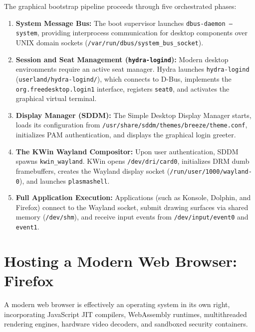 The graphical bootstrap pipeline proceeds through five orchestrated phases:
\begin{enumerate}
    \item \textbf{System Message Bus:} The boot supervisor launches \texttt{dbus-daemon --system}, providing interprocess communication for desktop components over UNIX domain sockets (\texttt{/var/run/dbus/system\_bus\_socket}).
    \item \textbf{Session and Seat Management (\texttt{hydra-logind}):} Modern desktop environments require an active seat manager. Hydra launches \texttt{hydra-logind} (\texttt{userland/hydra-logind/}), which connects to D-Bus, implements the \texttt{org.freedesktop.login1} interface, registers \texttt{seat0}, and activates the graphical virtual terminal.
    \item \textbf{Display Manager (SDDM):} The Simple Desktop Display Manager starts, loads its configuration from \texttt{/usr/share/sddm/themes/breeze/theme.conf}, initializes PAM authentication, and displays the graphical login greeter.
    \item \textbf{The KWin Wayland Compositor:} Upon user authentication, SDDM spawns \texttt{kwin\_wayland}. KWin opens \texttt{/dev/dri/card0}, initializes DRM dumb framebuffers, creates the Wayland display socket (\texttt{/run/user/1000/wayland-0}), and launches \texttt{plasmashell}.
    \item \textbf{Full Application Execution:} Applications (such as Konsole, Dolphin, and Firefox) connect to the Wayland socket, submit drawing surfaces via shared memory (\texttt{/dev/shm}), and receive input events from \texttt{/dev/input/event0} and \texttt{event1}.
\end{enumerate}

\section{Hosting a Modern Web Browser: Firefox}
\label{sec:hosting_browser}

A modern web browser is effectively an operating system in its own right, incorporating JavaScript JIT compilers, WebAssembly runtimes, multithreaded rendering engines, hardware video decoders, and sandboxed security containers.

